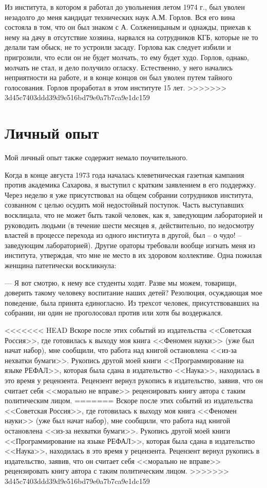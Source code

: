 \documentclass{book}
\begin{document}
Из института, в котором я работал до увольнения летом 1974 г., был уволен незадолго до меня кандидат технических наук А.М. Горлов. Вся его вина состояла в том, что он был знаком с А. Солженицыным и однажды, приехав к нему на дачу в отсутствие хозяина, нарвался на сотрудников КГБ, которые не то делали там обыск, не то устроили засаду. Горлова как следует избили и пригрозили, что если он не будет молчать, то ему будет худо. Горлов, однако, молчать не стал, и дело получило огласку. Естественно, у него начались неприятности на работе, и в конце концов он был уволен путем тайного голосования. Горлов проработал в этом институте 15 лет.
>>>>>>> 3d45c7403ddd39d9e516bd79e0a7b7ca9e1dc159



\section{Личный опыт}

Мой личный опыт также содержит немало поучительного.

Когда в конце августа 1973 года началась клеветническая газетная кампания против академика Сахарова, я выступил с кратким заявлением в его поддержку. Через неделю я уже присутствовал на общем собрании сотрудников института, созванном с целью осудить мой недостойный поступок. Часть выступавших восклицала, что не может быть такой человек, как я, заведующим лабораторией и руководить людьми (в течение шести месяцев я, действительно, по недосмотру властей в процессе перехода из одного института в другой, был -- о чудо! -- заведующим лабораторией). Другие ораторы требовали вообще изгнать меня из института, утверждая, что мне не место в их здоровом коллективе. Одна пожилая женщина патетически воскликнула:

--- Я вот смотрю, к нему все студенты ходят. Разве мы можем, товарищи, доверить такому человеку воспитание наших детей?
Резолюция, осуждающая мое поведение, была принята единогласно. Из трехсот человек, присутствовавших на собрании, ни один не проголосовал против или хотя бы воздержался.

<<<<<<< HEAD
Вскоре после этих событий из издательства <<Советская Россия>>, где готовилась к выходу моя книга <<Феномен науки>> (уже был начат набор), мне сообщили, что работа над книгой остановлена <<из‑за нехватки бумаги>>. Рукопись другой моей книги <<Программирование на языке РЕФАЛ>>, которая была сдана в издательство <<Наука>>, находилась в это время у рецензента. Рецензент вернул рукопись в издательство, заявив, что он считает себя <<морально не вправе>> рецензировать книгу автора с таким политическим лицом.
=======
Вскоре после этих событий из издательства <<Советская Россия>>, где готовилась к выходу моя книга <<Феномен науки>> (уже был начат набор), мне сообщили, что работа над книгой остановлена <<из-за нехватки бумаги>>. Рукопись другой моей книги <<Программирование на языке РЕФАЛ>>, которая была сдана в издательство <<Наука>>, находилась в это время у рецензента. Рецензент вернул рукопись в издательство, заявив, что он считает себя <<морально не вправе>> рецензировать книгу автора с таким политическим лицом.
>>>>>>> 3d45c7403ddd39d9e516bd79e0a7b7ca9e1dc159
\end{document}
